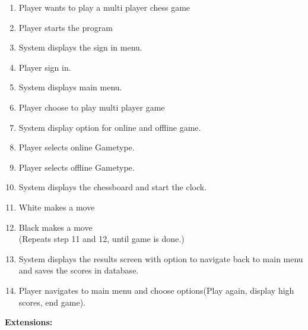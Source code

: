 \documentclass{article}
\begin{document}
\begin{flushleft}
\begin{enumerate}
	\item	 Player wants to play a multi player chess game
	\item 	 Player starts the program
	\item 	 System displays the sign in menu.
	\item 	 Player sign in.
	\item    System displays main menu.
	\item    Player choose to play multi player game
	\item    System display option for online and offline game.
	\item    Player selects online Gametype.
	\item    Player selects offline Gametype.
	\item    System displays the chessboard and start the clock. 
	\item 	 White makes a move
	\item	 Black makes a move\\
	(Repeats step 11 and 12, until game is done.)
	\item    System displays the results screen with option to navigate back to main menu and saves the scores in database.
	\item 	 Player navigates to main menu and choose options(Play again, display high scores, end game).
		
\end{enumerate}
	
	\textbf{Extensions:} \\
	

\end{flushleft}
\end{document}
